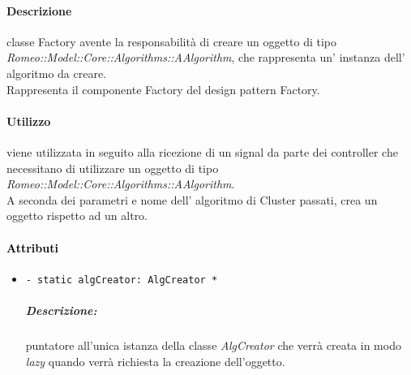 	\paragraph{Descrizione\\}
	classe Factory avente la responsabilità di creare un oggetto di tipo \textsl{Romeo::Model::Core::Algorithms::AAlgorithm}, che rappresenta un' instanza dell' algoritmo da creare.
    \\Rappresenta il componente Factory del design pattern\g{} Factory.

	\paragraph{Utilizzo\\}
	viene utilizzata in seguito alla ricezione di un signal\g{} da parte dei controller che necessitano di utilizzare un oggetto di tipo \textsl{Romeo::Model::Core::Algorithms::AAlgorithm}.
	\\A seconda dei parametri e nome dell’ algoritmo di Cluster\g{} passati, crea un oggetto rispetto ad un altro.

	\paragraph{\textcolor{black}{Attributi\\}}
		\begin{itemize}
			\item \color{teal}\verb!- static algCreator: AlgCreator *!
			\color{black}
			\subparagraph{Descrizione:} puntatore all'unica istanza della classe \textsl{AlgCreator} che verrà creata in modo \textit{lazy} quando verrà richiesta la creazione dell'oggetto.
		\end{itemize}
		
